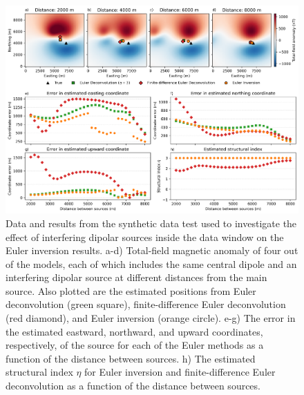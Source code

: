 \begin{figure}[tb!]
\centering
\includegraphics[width=1\linewidth]{figures/synthetic-interfering-sources.png}
\caption{
    Data and results from the synthetic data test used to investigate the
    effect of interfering dipolar sources inside the data window on the Euler
    inversion results.
    a-d) Total-field magnetic anomaly of four out of the \SynInterfNModels{}
    models, each of which includes the same central dipole and an interfering
    dipolar source at different distances from the main source. Also plotted
    are the estimated positions from Euler deconvolution (green square),
    finite-difference Euler deconvolution (red diamond), and Euler inversion
    (orange circle).
    e-g) The error in the estimated eastward, northward, and upward
    coordinates, respectively, of the source for each of the Euler methods as
    a function of the distance between sources.
    h) The estimated structural index $\eta$ for Euler inversion and
    finite-difference Euler deconvolution as a function of the distance between
    sources.
}
\label{fig:interf}
\end{figure}

